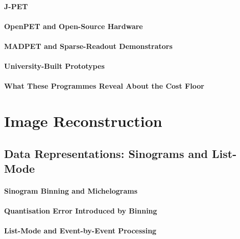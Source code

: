 \paragraph{J-PET}

\paragraph{OpenPET and Open-Source Hardware}

\paragraph{MADPET and Sparse-Readout Demonstrators}

\paragraph{University-Built Prototypes}

\paragraph{What These Programmes Reveal About the Cost Floor}

\section{Image Reconstruction}
\label{sec:reconstruction}

\subsection{Data Representations: Sinograms and List-Mode}

\paragraph{Sinogram Binning and Michelograms}

\paragraph{Quantisation Error Introduced by Binning}

\paragraph{List-Mode and Event-by-Event Processing}

